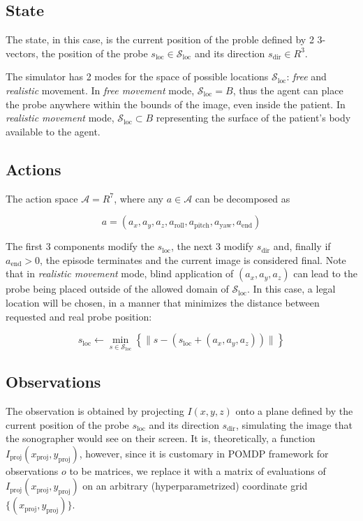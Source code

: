 \subsection{State}

The state, in this case, is the current position of the proble defined by 2 3-vectors, the position of the probe $s_\text{loc} \in \mathcal{S}_\text{loc}$ and its direction $s_\text{dir} \in R^{3}$.

The simulator has 2 modes for the space of possible locations $\mathcal{S}_\text{loc}$: \emph{free} and \emph{realistic} movement.
In \emph{free movement} mode, $\mathcal{S}_\text{loc} = B$, thus the agent can place the probe anywhere within the bounds of the image, even inside the patient.
In \emph{realistic movement} mode, $\mathcal{S}_\text{loc} \subset B$ representing the surface of the patient's body available to the agent.

\subsection{Actions}

The action space $\mathcal{A} = R^{7}$, where any $a \in \mathcal{A}$ can be decomposed as

\begin{equation}
    a = (a_{x} , a_{y} , a_{z} , a_\text{roll} , a_\text{pitch} , a_\text{yaw}, a_\text{end})
\end{equation}

The first 3 components modify the $s_\text{loc}$, the next 3 modify $s_\text{dir}$ and, finally if $a_\text{end} > 0$, the episode terminates and the current image is considered final.
Note that in \emph{realistic movement} mode, blind application of $(a_{x} , a_{y} , a_{z})$ can lead to the probe being placed outside of the allowed domain of $\mathcal{S}_\text{loc}$.
In this case, a legal location will be chosen, in a manner that minimizes the distance between requested and real probe position:

\begin{equation}
    s_\text{loc} \leftarrow \min_{s \in \mathcal{S}_\text{loc}} \left\{ \lVert s - (s_\text{loc} + (a_{x} , a_{y} , a_{z})) \rVert \right\}
\end{equation}

\subsection{Observations}

The observation is obtained by projecting $I(x,y,z)$ onto a plane defined by the current position of the probe $s_\text{loc}$ and its direction $s_\text{dir}$, simulating the image that the sonographer would see on their screen.
It is, theoretically, a function $I_\text{proj}(x_\text{proj}, y_\text{proj})$, however, since it is customary in POMDP framework for observations $o$ to be matrices, we replace it with a matrix of evaluations of $I_\text{proj}(x_\text{proj}, y_\text{proj})$ on an arbitrary (hyperparametrized) coordinate grid $\{(x_\text{proj}, y_\text{proj})\}$.

